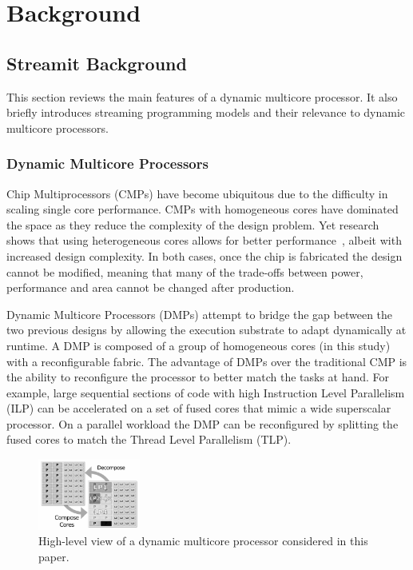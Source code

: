 \chapter{Background}

\section{Streamit Background}
This section reviews the main features of a dynamic multicore processor.
It also  briefly introduces streaming programming models and their relevance to dynamic multicore processors.

\subsection{Dynamic Multicore Processors}


Chip Multiprocessors (CMPs) have become ubiquitous due to the difficulty in scaling single core performance.
CMPs with homogeneous cores have dominated the space as they reduce the complexity of the design problem.
Yet research shows that using heterogeneous cores allows for better performance~\cite{suleman2009asymmetric}, albeit with increased design complexity. 
In both cases, once the chip is fabricated the design cannot be modified, meaning that many of the trade-offs between power, performance and area cannot be changed after production.

Dynamic Multicore Processors (DMPs) attempt to bridge the gap between the two previous designs by allowing the execution substrate to adapt dynamically at runtime.
A DMP is composed of a group of homogeneous cores (in this study) with a reconfigurable fabric.
The advantage of DMPs over the traditional CMP is the ability to reconfigure the processor to better match the tasks at hand.
For example, large sequential sections of code with high Instruction Level Parallelism (ILP) can be accelerated on a set of fused cores that mimic a wide superscalar processor.
On a parallel workload the DMP can be reconfigured by splitting the fused cores to match the Thread Level Parallelism (TLP).

\begin{figure}[t]
    \centering
    \includegraphics[width=0.3\textwidth]{streamit-paper/graphics/dmcgraph.pdf}
    \caption{High-level view of a dynamic multicore processor considered in this paper.}
    \label{fig:dynmulticore}
\end{figure}

